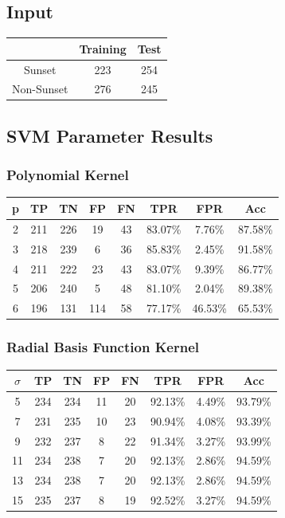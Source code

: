 \documentclass{article}
\begin{document}
\subsection{Input}
\begin{tabular}{ | c | c | c |}
\hline
 & Training & Test \\
\hline
Sunset & 223 & 254 \\
\hline
Non-Sunset & 276 & 245 \\
\hline
\end{tabular}

\subsection{SVM Parameter Results}
\subsubsection{Polynomial Kernel}
\begin{tabular}{ | c | c | c | c | c | c | c | c |}
\hline
p & TP & TN & FP & FN & TPR & FPR & Acc \\
\hline
2 & 211 & 226 & 19 & 43 & 83.07\% & 7.76\% & 87.58\% \\
\hline
3 & 218 & 239 & 6 & 36 & 85.83\% & 2.45\% & 91.58\% \\
\hline
4 & 211 & 222 & 23 & 43 & 83.07\% & 9.39\% & 86.77\% \\
\hline
5 & 206 & 240 & 5 & 48 & 81.10\% & 2.04\% & 89.38\% \\
\hline
6 & 196 & 131 & 114 & 58 & 77.17\% & 46.53\% & 65.53\% \\
\hline
\end{tabular}

\subsubsection{Radial Basis Function Kernel}
\begin{tabular}{ | c | c | c | c | c | c | c | c |}
\hline
\(\sigma\) & TP & TN & FP & FN & TPR & FPR & Acc \\
\hline
5 & 234 & 234 & 11 & 20 & 92.13\% & 4.49\% & 93.79\% \\
\hline
7 & 231 & 235 & 10 & 23 & 90.94\% & 4.08\% & 93.39\% \\
\hline
9 & 232 & 237 & 8 & 22 & 91.34\% & 3.27\% & 93.99\% \\
\hline
11 & 234 & 238 & 7 & 20 & 92.13\% & 2.86\% & 94.59\% \\
\hline
13 & 234 & 238 & 7 & 20 & 92.13\% & 2.86\% & 94.59\% \\
\hline
15 & 235 & 237 & 8 & 19 & 92.52\% & 3.27\% & 94.59\% \\
\hline
\end{tabular}
\end{document}
